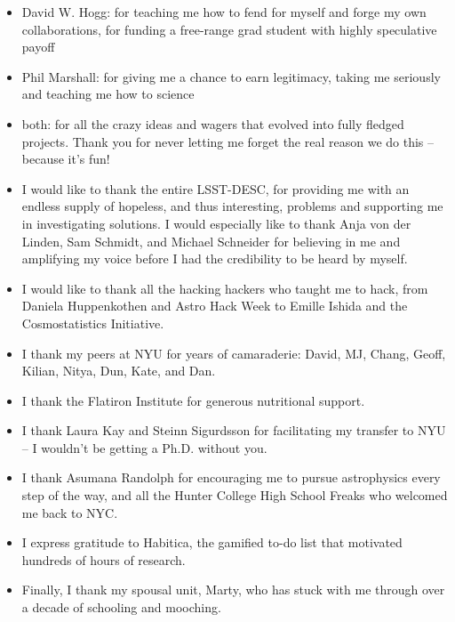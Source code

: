 \begin{itemize}
	\item David W. Hogg: for teaching me how to fend for myself and forge my own collaborations, for funding a free-range grad student with highly speculative payoff
	\item Phil Marshall: for giving me a chance to earn legitimacy, taking me seriously and teaching me how to science
	\item both: for all the crazy ideas and wagers that evolved into fully fledged projects.
	Thank you for never letting me forget the real reason we do this -- because it’s fun!
	\item I would like to thank the entire LSST-DESC, for providing me with an endless supply of hopeless, and thus interesting, problems and supporting me in investigating solutions. 
	I would especially like to thank Anja von der Linden, Sam Schmidt, and Michael Schneider for believing in me and amplifying my voice before I had the credibility to be heard by myself.
	\item I would like to thank all the hacking hackers who taught me to hack, from Daniela Huppenkothen and Astro Hack Week to Emille Ishida and the Cosmostatistics Initiative.
	\item I thank my peers at NYU for years of camaraderie: David, MJ, Chang, Geoff, Kilian, Nitya, Dun, Kate, and Dan.
	\item I thank the Flatiron Institute for generous nutritional support.
	\item I thank Laura Kay and Steinn Sigurdsson for facilitating my transfer to NYU -- I wouldn't be getting a Ph.D. without you.
	\item I thank Asumana Randolph for encouraging me to pursue astrophysics every step of the way, and all the Hunter College High School Freaks who welcomed me back to NYC.
	\item I express gratitude to Habitica, the gamified to-do list that motivated hundreds of hours of research.
	\item Finally, I thank my spousal unit, Marty, who has stuck with me through over a decade of schooling and mooching.
\end{itemize}
